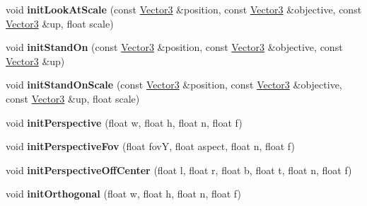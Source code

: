 \begin{DoxyCompactItemize}
\item 
void {\bfseries init\+Look\+At\+Scale} (const \hyperlink{class_i_dream_sky_1_1_vector3}{Vector3} \&position, const \hyperlink{class_i_dream_sky_1_1_vector3}{Vector3} \&objective, const \hyperlink{class_i_dream_sky_1_1_vector3}{Vector3} \&up, float scale)\hypertarget{class_i_dream_sky_1_1_matrix4_abbea4957a07629a5d75fa29f0cc4210a}{}\label{class_i_dream_sky_1_1_matrix4_abbea4957a07629a5d75fa29f0cc4210a}

\item 
void {\bfseries init\+Stand\+On} (const \hyperlink{class_i_dream_sky_1_1_vector3}{Vector3} \&position, const \hyperlink{class_i_dream_sky_1_1_vector3}{Vector3} \&objective, const \hyperlink{class_i_dream_sky_1_1_vector3}{Vector3} \&up)\hypertarget{class_i_dream_sky_1_1_matrix4_ac9483e5bc7832192d38516bc71f1cb3f}{}\label{class_i_dream_sky_1_1_matrix4_ac9483e5bc7832192d38516bc71f1cb3f}

\item 
void {\bfseries init\+Stand\+On\+Scale} (const \hyperlink{class_i_dream_sky_1_1_vector3}{Vector3} \&position, const \hyperlink{class_i_dream_sky_1_1_vector3}{Vector3} \&objective, const \hyperlink{class_i_dream_sky_1_1_vector3}{Vector3} \&up, float scale)\hypertarget{class_i_dream_sky_1_1_matrix4_ad0db72aeef56e1da5cab10ec8bc94274}{}\label{class_i_dream_sky_1_1_matrix4_ad0db72aeef56e1da5cab10ec8bc94274}

\item 
void {\bfseries init\+Perspective} (float w, float h, float n, float f)\hypertarget{class_i_dream_sky_1_1_matrix4_a76f94c959ebcbc421711c26746540ed3}{}\label{class_i_dream_sky_1_1_matrix4_a76f94c959ebcbc421711c26746540ed3}

\item 
void {\bfseries init\+Perspective\+Fov} (float fovY, float aspect, float n, float f)\hypertarget{class_i_dream_sky_1_1_matrix4_a23af89991107c39bfd587e920dd288ed}{}\label{class_i_dream_sky_1_1_matrix4_a23af89991107c39bfd587e920dd288ed}

\item 
void {\bfseries init\+Perspective\+Off\+Center} (float l, float r, float b, float t, float n, float f)\hypertarget{class_i_dream_sky_1_1_matrix4_ae3372ce8c2e9085d9268e6b210f101da}{}\label{class_i_dream_sky_1_1_matrix4_ae3372ce8c2e9085d9268e6b210f101da}

\item 
void {\bfseries init\+Orthogonal} (float w, float h, float n, float f)\hypertarget{class_i_dream_sky_1_1_matrix4_af9e39fd6de51edc9b7dc678d9e7572a1}{}\label{class_i_dream_sky_1_1_matrix4_af9e39fd6de51edc9b7dc678d9e7572a1}


\end{DoxyCompactItemize}
